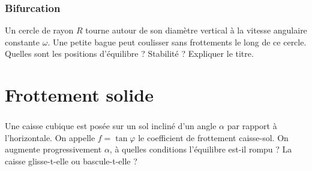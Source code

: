 \documentclass[a4paper,french,bookmarks]{book}
\begin{document}
    \subsection{Bifurcation}
    
    Un cercle de rayon $R$ tourne autour de son diamètre vertical à la vitesse angulaire constante $\omega$. Une petite bague peut coulisser sans frottements le long de ce cercle. Quelles sont les positions d'équilibre ? Stabilité ? Expliquer le titre.
    
    
    \chapter{Frottement solide}
    
    \subsection{}
    
    Une caisse cubique est posée sur un sol incliné d'un angle $\alpha$ par rapport à l'horizontale. On appelle $f = \tan \varphi$ le coefficient de frottement caisse-sol. On augmente progressivement $\alpha$, à quelles conditions l'équilibre est-il rompu ? La caisse glisse-t-elle ou bascule-t-elle ?
    
    
    
    \subsection{}
    
\end{document}
